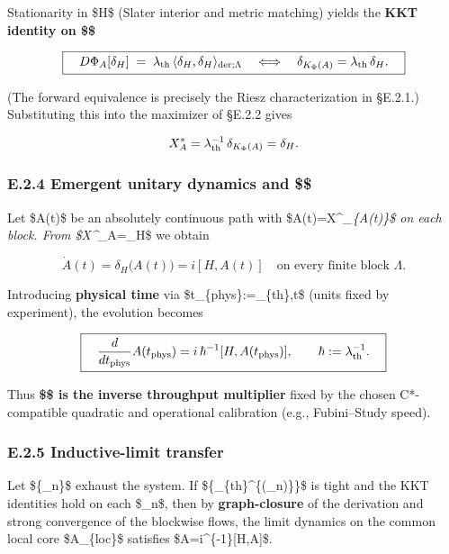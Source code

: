 \documentclass[
]{article}
\numberwithin{equation}{section}
\begin{document}
Stationarity in \$H\$ (Slater interior and metric matching) yields the
\textbf{KKT identity on \$\Lambda\$}

\[
\boxed{\quad D\Phi_A[\delta_H]\;=\;\lambda_{\rm th}\,\langle \delta_H,\delta_H\rangle_{{\rm der};\Lambda}
\quad\Longleftrightarrow\quad \delta_{K_\Phi(A)}=\lambda_{\rm th}\,\delta_H.\quad}
\]

(The forward equivalence is precisely the Riesz characterization in
§E.2.1.) Substituting this into the maximizer of §E.2.2 gives

\[
X^*_A=\lambda_{\rm th}^{-1}\,\delta_{K_\Phi(A)}=\delta_H.
\]

\hypertarget{e.2.4-emergent-unitary-dynamics-and}{%
\subsubsection{\texorpdfstring{E.2.4 Emergent unitary dynamics and
\$\hbar\$}{E.2.4 Emergent unitary dynamics and \$\$}}\label{e.2.4-emergent-unitary-dynamics-and}}

Let \$A(t)\$ be an absolutely continuous path with
\$\dot A(t)=X\^{}\emph{\_\{A(t)\}\$ on each block. From
\$X\^{}}\_A=\delta\_H\$ we obtain

\[
\boxed{\quad \dot A(t)=\delta_H\big(A(t)\big)=i[H,A(t)]\quad\text{on every finite block } \Lambda.\quad}
\]

Introducing \textbf{physical time} via
\$t\_\{\rm phys\}:=\lambda\_\{\rm th\},t\$ (units fixed by experiment),
the evolution becomes

\[
\boxed{\quad \frac{d}{dt_{\rm phys}}A(t_{\rm phys})=i\,\hbar^{-1}[H,A(t_{\rm phys})],\qquad \hbar:=\lambda_{\rm th}^{-1}.\quad}
\]

Thus \textbf{\$\hbar\$ is the inverse throughput multiplier} fixed by
the chosen C*-compatible quadratic and operational calibration (e.g.,
Fubini--Study speed).

\hypertarget{e.2.5-inductive-limit-transfer}{%
\subsubsection{E.2.5 Inductive-limit
transfer}\label{e.2.5-inductive-limit-transfer}}

Let \$\{\Lambda\_n\}\$ exhaust the system. If
\$\{\lambda\_\{\rm th\}\^{}\{(\Lambda\_n)\}\}\$ is tight and the KKT
identities hold on each \$\Lambda\_n\$, then by \textbf{graph-closure}
of the derivation and strong convergence of the blockwise flows, the
limit dynamics on the common local core \$\mathcal A\_\{\rm loc\}\$
satisfies \$\dot A=i\hbar\^{}\{-1\}{[}H,A{]}\$.
\end{document}
